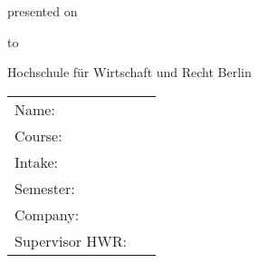 
\thispagestyle{empty}

\begin{center}
	\huge\topic

	
	\vspace{1.5cm}
	\normalsize{
	\type

	\vspace{1.5cm}
	presented on \dateofsubmission 

	\vspace{1.5cm}
	to

	\vspace{1.5cm}
	Hochschule für Wirtschaft und Recht Berlin
}

\end{center}	

\vspace{1.5cm}

\renewcommand{\arraystretch}{2}
\begin{tabular}{l l}
	Name: & \studentfirstname~\studentlastname \tabularnewline
	Course: & \course \tabularnewline
	Intake: & \intake \tabularnewline
	Semester: & \semester \tabularnewline
	Company: & \company \tabularnewline
	Supervisor HWR: & \supervisorhwr \tabularnewline
\end{tabular}
